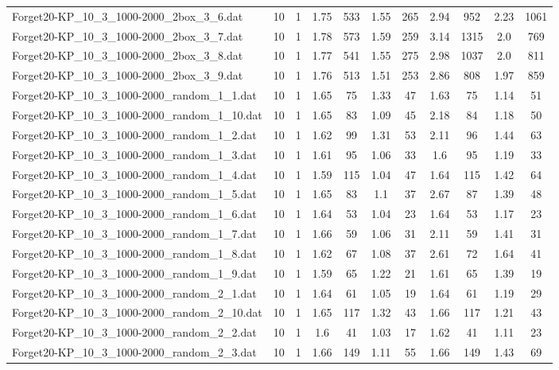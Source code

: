 \begin{table}[!ht]
\begin{tabular}{lcccccccccc}
Forget20-KP\_10\_3\_1000-2000\_2box\_3\_6.dat & 10 & 1 & 1.75 & 533 & 1.55 & 265 & 2.94 & 952 & 2.23 & 1061 \\
Forget20-KP\_10\_3\_1000-2000\_2box\_3\_7.dat & 10 & 1 & 1.78 & 573 & 1.59 & 259 & 3.14 & 1315 & 2.0 & 769 \\
Forget20-KP\_10\_3\_1000-2000\_2box\_3\_8.dat & 10 & 1 & 1.77 & 541 & 1.55 & 275 & 2.98 & 1037 & 2.0 & 811 \\
Forget20-KP\_10\_3\_1000-2000\_2box\_3\_9.dat & 10 & 1 & 1.76 & 513 & 1.51 & 253 & 2.86 & 808 & 1.97 & 859 \\
Forget20-KP\_10\_3\_1000-2000\_random\_1\_1.dat & 10 & 1 & 1.65 & 75 & 1.33 & 47 & 1.63 & 75 & 1.14 & 51 \\
Forget20-KP\_10\_3\_1000-2000\_random\_1\_10.dat & 10 & 1 & 1.65 & 83 & 1.09 & 45 & 2.18 & 84 & 1.18 & 50 \\
Forget20-KP\_10\_3\_1000-2000\_random\_1\_2.dat & 10 & 1 & 1.62 & 99 & 1.31 & 53 & 2.11 & 96 & 1.44 & 63 \\
Forget20-KP\_10\_3\_1000-2000\_random\_1\_3.dat & 10 & 1 & 1.61 & 95 & 1.06 & 33 & 1.6 & 95 & 1.19 & 33 \\
Forget20-KP\_10\_3\_1000-2000\_random\_1\_4.dat & 10 & 1 & 1.59 & 115 & 1.04 & 47 & 1.64 & 115 & 1.42 & 64 \\
Forget20-KP\_10\_3\_1000-2000\_random\_1\_5.dat & 10 & 1 & 1.65 & 83 & 1.1 & 37 & 2.67 & 87 & 1.39 & 48 \\
Forget20-KP\_10\_3\_1000-2000\_random\_1\_6.dat & 10 & 1 & 1.64 & 53 & 1.04 & 23 & 1.64 & 53 & 1.17 & 23 \\
Forget20-KP\_10\_3\_1000-2000\_random\_1\_7.dat & 10 & 1 & 1.66 & 59 & 1.06 & 31 & 2.11 & 59 & 1.41 & 31 \\
Forget20-KP\_10\_3\_1000-2000\_random\_1\_8.dat & 10 & 1 & 1.62 & 67 & 1.08 & 37 & 2.61 & 72 & 1.64 & 41 \\
Forget20-KP\_10\_3\_1000-2000\_random\_1\_9.dat & 10 & 1 & 1.59 & 65 & 1.22 & 21 & 1.61 & 65 & 1.39 & 19 \\
Forget20-KP\_10\_3\_1000-2000\_random\_2\_1.dat & 10 & 1 & 1.64 & 61 & 1.05 & 19 & 1.64 & 61 & 1.19 & 29 \\
Forget20-KP\_10\_3\_1000-2000\_random\_2\_10.dat & 10 & 1 & 1.65 & 117 & 1.32 & 43 & 1.66 & 117 & 1.21 & 43 \\
Forget20-KP\_10\_3\_1000-2000\_random\_2\_2.dat & 10 & 1 & 1.6 & 41 & 1.03 & 17 & 1.62 & 41 & 1.11 & 23 \\
Forget20-KP\_10\_3\_1000-2000\_random\_2\_3.dat & 10 & 1 & 1.66 & 149 & 1.11 & 55 & 1.66 & 149 & 1.43 & 69 \\

\end{tabular}
\end{table}
